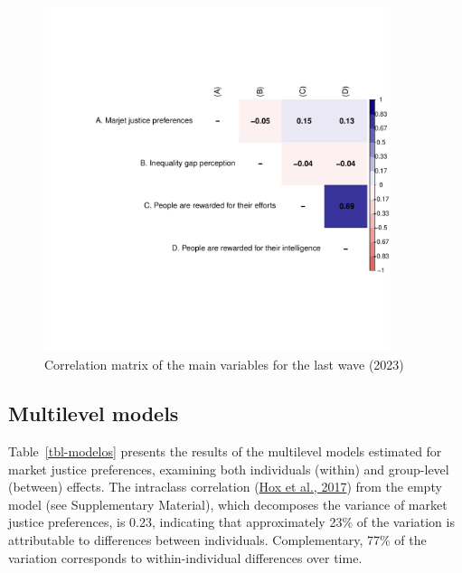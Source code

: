 \documentclass[
  12pt,
]{article}
\begin{document}
\begin{figure}[H]

{\centering \includegraphics[width=0.9\textwidth,height=\textheight]{figure3.pdf}

}

\caption{\label{figure3}Correlation matrix of the main variables for
the last wave (2023)}

\end{figure}

\hypertarget{multilevel-models}{%
\subsection{Multilevel models}\label{multilevel-models}}

Table~\ref{tbl-modelos} presents the results of the multilevel models
estimated for market justice preferences, examining both individuals
(within) and group-level (between) effects. The intraclass correlation
(\protect\hyperlink{ref-hoxMultilevelAnalysisTechniques2017a}{Hox et
al., 2017}) from the empty model (see Supplementary Material), which
decomposes the variance of market justice preferences, is 0.23,
indicating that approximately 23\% of the variation is attributable to
differences between individuals. Complementary, 77\% of the variation
corresponds to within-individual differences over time.
\end{document}
